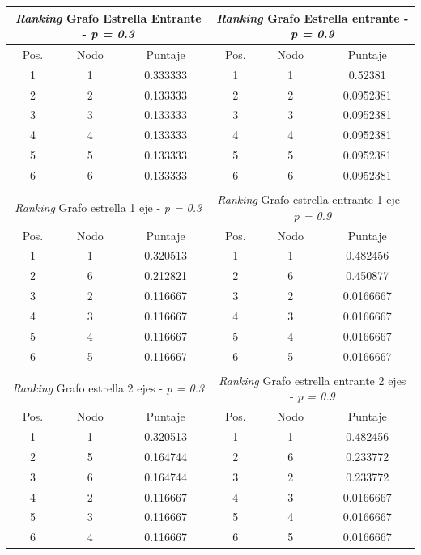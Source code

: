 \begin{center}
         \begin{tabular}{|c|c|c||c|c|c|}
                    \hline
                    \multicolumn{3}{|c||}{\emph{Ranking} Grafo Estrella Entrante - \emph{p = 0.3}} & \multicolumn{3}{c|}{\emph{Ranking} Grafo Estrella entrante - \emph{p = 0.9}} \\ \hline
                    Pos. & Nodo & Puntaje    & Pos. & Nodo & Puntaje  \\ \hline
1 & 1 & 0.333333 & 1 & 1 & 0.52381 \\ 
2 & 2 & 0.133333 & 2 & 2 & 0.0952381 \\
3 & 3 & 0.133333  & 3 & 3 & 0.0952381 \\
4 & 4 & 0.133333  & 4 & 4 & 0.0952381 \\
5 &  5 & 0.133333 & 5 & 5 &  0.0952381\\
6 & 6 & 0.133333 & 6 & 6 & 0.0952381 \\
 \hline
                    \multicolumn{3}{c}{} \\ \hline
                    \multicolumn{3}{|c||}{\emph{Ranking} Grafo estrella 1 eje - \emph{p = 0.3}} & \multicolumn{3}{c|}{\emph{Ranking} Grafo estrella entrante 1 eje - \emph{p = 0.9}} \\ \hline
                    Pos. & Nodo & Puntaje    & Pos. & Nodo & Puntaje  \\ \hline
1 & 1 & 0.320513 & 1 & 1 & 0.482456 \\ 
2 & 6 & 0.212821 & 2 & 6 &  0.450877 \\
3 & 2 & 0.116667  & 3 & 2 & 0.0166667 \\
4 & 3 & 0.116667  & 4 & 3 & 0.0166667 \\
5 &  4 & 0.116667 & 5 & 4 &  0.0166667 \\
6 & 5 & 0.116667 & 6 & 5 & 0.0166667 \\
 \hline
 
                    \multicolumn{3}{c}{} \\ \hline
                    \multicolumn{3}{|c||}{\emph{Ranking} Grafo estrella 2 ejes - \emph{p = 0.3}} & \multicolumn{3}{c|}{\emph{Ranking} Grafo estrella entrante 2 ejes - \emph{p = 0.9}} \\ \hline
                    Pos. & Nodo & Puntaje    & Pos. & Nodo & Puntaje  \\ \hline 
 1 & 1 & 0.320513 & 1 & 1 & 0.482456 \\ 
2 & 5 & 0.164744 & 2 & 6 &  0.233772 \\
3 & 6 & 0.164744  & 3 & 2 &  0.233772 \\
4 & 2 & 0.116667  & 4 & 3 & 0.0166667 \\
5 &  3 & 0.116667 & 5 & 4 &  0.0166667 \\
6 & 4 & 0.116667 & 6 & 5 & 0.0166667 \\ \hline


\end{tabular}
\end{center}
